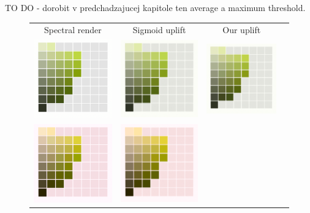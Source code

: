 TO DO - dorobit v predchadzajucej kapitole ten average a maximum threshold. 


\begin{figure}[t]
	\centering
	{\sffamily
		\begin{tabular}{cccc}
			Spectral render & Sigmoid uplift & Our uplift
			\vspace{1em} \\
			\includegraphics[width=.30\linewidth]{img/results_art_page14_originalD65.png}
			&
			\includegraphics[width=.30\linewidth]{img/results_art_page14_sigmoidD65.png}
			& 
			\includegraphics[width=.30\linewidth]{img/results_art_page14_ourD65.png}
			\vspace{1em} \\
			\includegraphics[width=.30\linewidth]{img/results_art_page14_originalFL11.png}
			&
			\includegraphics[width=.30\linewidth]{img/results_art_page14_sigmoidFL11.png}

\end{tabular}}
\end{figure}

